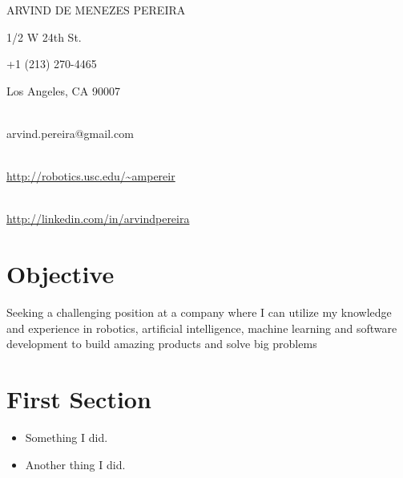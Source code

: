 \documentclass[10pt]{article}
\begin{document}
\centerline{\LARGE{ARVIND DE MENEZES PEREIRA}}  %
{ 1/2 W 24th St.}               {\raggedright +1 (213) 270-4465}
{\raggedleft Los Angeles, CA 90007}       {\raggedright \\arvind.pereira@gmail.com}
{\raggedleft \\ \url{http://robotics.usc.edu/~ampereir}} {\raggedright \\ \url{http://linkedin.com/in/arvindpereira}}

\section{Objective}
Seeking a challenging position at a company where I can utilize my knowledge and experience in robotics, artificial intelligence, machine learning and software development to build amazing products and solve big problems


\section{First Section}

\begin{itemize}
\item Something I did.
\item Another thing I did.
\end{itemize}
\end{document}
